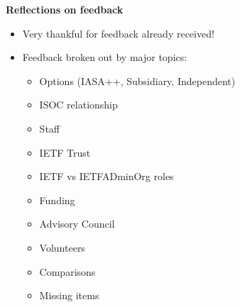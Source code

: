 \documentclass[helvetica,a4paper,landscape]{seminar}
\newcommand{\heading}[1]{%
  \begin{center} 
    \large\bf 
    #1 
  \end{center} 
  \vspace{.4 in}}
\begin{document}




\begin{slide}

\heading{Reflections on feedback}

{\footnotesize
\begin{itemize}
\item Very thankful for feedback already received!
\item Feedback broken out by major topics:
\begin{itemize}
\item Options (IASA++, Subsidiary, Independent)
\item ISOC relationship
\item Staff
\item IETF Trust
\item IETF vs IETFADminOrg roles
\item Funding
\item Advisory Council
\item Volunteers
\item Comparisons
\item Missing items
\end{itemize}
\end{itemize}
}
\end{slide}
\end{document}
